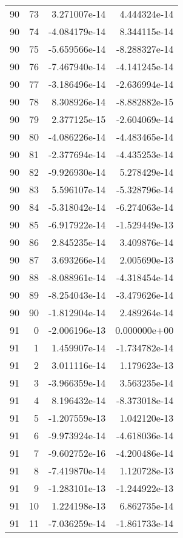 \begin{tabular}{rrrr}
  90 &   73 &  3.271007e-14 &  4.444324e-14 \\
  90 &   74 & -4.084179e-14 &  8.344115e-14 \\
  90 &   75 & -5.659566e-14 & -8.288327e-14 \\
  90 &   76 & -7.467940e-14 & -4.141245e-14 \\
  90 &   77 & -3.186496e-14 & -2.636994e-14 \\
  90 &   78 &  8.308926e-14 & -8.882882e-15 \\
  90 &   79 &  2.377125e-15 & -2.604069e-14 \\
  90 &   80 & -4.086226e-14 & -4.483465e-14 \\
  90 &   81 & -2.377694e-14 & -4.435253e-14 \\
  90 &   82 & -9.926930e-14 &  5.278429e-14 \\
  90 &   83 &  5.596107e-14 & -5.328796e-14 \\
  90 &   84 & -5.318042e-14 & -6.274063e-14 \\
  90 &   85 & -6.917922e-14 & -1.529449e-13 \\
  90 &   86 &  2.845235e-14 &  3.409876e-14 \\
  90 &   87 &  3.693266e-14 &  2.005690e-13 \\
  90 &   88 & -8.088961e-14 & -4.318454e-14 \\
  90 &   89 & -8.254043e-14 & -3.479626e-14 \\
  90 &   90 & -1.812904e-14 &  2.489264e-14 \\
  91 &    0 & -2.006196e-13 &  0.000000e+00 \\
  91 &    1 &  1.459907e-14 & -1.734782e-14 \\
  91 &    2 &  3.011116e-14 &  1.179623e-13 \\
  91 &    3 & -3.966359e-14 &  3.563235e-14 \\
  91 &    4 &  8.196432e-14 & -8.373018e-14 \\
  91 &    5 & -1.207559e-13 &  1.042120e-13 \\
  91 &    6 & -9.973924e-14 & -4.618036e-14 \\
  91 &    7 & -9.602752e-16 & -4.200486e-14 \\
  91 &    8 & -7.419870e-14 &  1.120728e-13 \\
  91 &    9 & -1.283101e-13 & -1.244922e-13 \\
  91 &   10 &  1.224198e-13 &  6.862735e-14 \\
  91 &   11 & -7.036259e-14 & -1.861733e-14 \\

\end{tabular}
